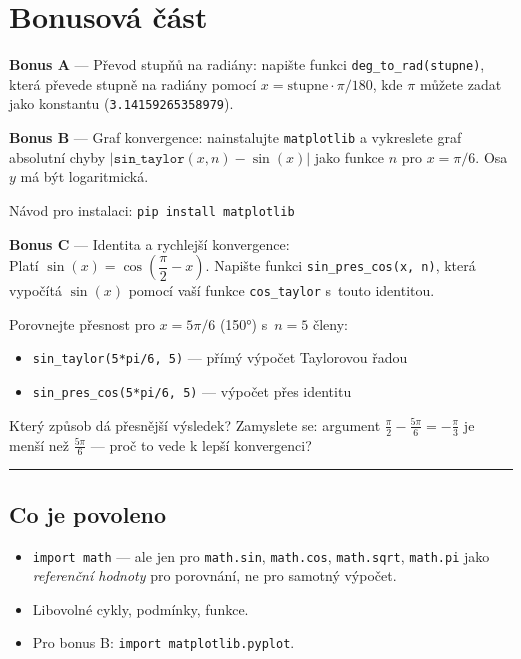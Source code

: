 \documentclass[12pt, a4paper]{article}
\begin{document}
\bigskip

\section*{Bonusová část}

\begin{bonusbox}
\textbf{Bonus A} --- Převod stupňů na radiány:
napište funkci \texttt{deg\_to\_rad(stupne)}, která převede
stupně na radiány pomocí $x = \mathrm{stupne} \cdot \pi / 180$,
kde $\pi$ můžete zadat jako konstantu (\texttt{3.14159265358979}).

\medskip

\textbf{Bonus B} --- Graf konvergence:
nainstalujte \texttt{matplotlib} a vykreslete graf absolutní chyby
$|\texttt{sin\_taylor}(x, n) - \sin(x)|$ jako funkce $n$
pro $x = \pi/6$. Osa $y$ má být logaritmická.

Návod pro instalaci: \texttt{pip install matplotlib}

\medskip

\textbf{Bonus C} --- Identita a rychlejší konvergence:\\
Platí $\sin(x) = \cos\!\left(\dfrac{\pi}{2} - x\right)$.
Napište funkci \texttt{sin\_pres\_cos(x, n)}, která vypočítá $\sin(x)$
pomocí vaší funkce \texttt{cos\_taylor} s~touto identitou.

Porovnejte přesnost pro $x = 5\pi/6$ (150°) s~$n = 5$ členy:
\begin{itemize}
    \item \texttt{sin\_taylor(5*pi/6,~5)} --- přímý výpočet Taylorovou řadou
    \item \texttt{sin\_pres\_cos(5*pi/6,~5)} --- výpočet přes identitu
\end{itemize}
Který způsob dá přesnější výsledek?
Zamyslete se: argument $\tfrac{\pi}{2} - \tfrac{5\pi}{6} = -\tfrac{\pi}{3}$
je menší než $\tfrac{5\pi}{6}$ --- proč to vede k lepší konvergenci?
\end{bonusbox}

\bigskip
\hrule
\bigskip

\subsection*{Co je povoleno}

\begin{itemize}
    \item \texttt{import math} --- ale jen pro \texttt{math.sin},
          \texttt{math.cos}, \texttt{math.sqrt}, \texttt{math.pi}
          jako \emph{referenční hodnoty} pro porovnání,
          ne pro samotný výpočet.
    \item Libovolné cykly, podmínky, funkce.
    \item Pro bonus B: \texttt{import matplotlib.pyplot}.
\end{itemize}
\end{document}

